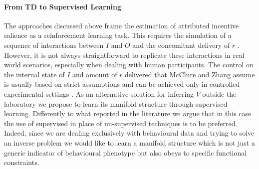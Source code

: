 \paragraph*{\textbf{From TD to Supervised Learning}}
\label{td_to_supervised}The approaches discussed above frame the estimation of attributed incentive salience as a reinforcement learning task. This requires the simulation of a sequence of interactions between $I$ and $O$ and the concomitant delivery of $r$  \cite{schultz1997neural,mcclure2003computational,zhang2009neural}. However, it is not always straightforward to replicate these interactions in real world scenarios, especially when dealing with human participants. The control on the internal state of $I$ and amount of $r$ delivered that McClure and Zhang assume is usually based on strict assumptions and can be achieved only in controlled experimental settings \cite{mcclure2003computational,zhang2009neural}. As an alternative solution for inferring $V$ outside the laboratory we propose to learn its manifold structure through supervised learning. Differently to what reported in the literature \cite{calhoun2019unsupervised, mccullough2021unsupervised, luxem2020identifying, pereira2020quantifying, shi2021learning} we argue that in this case the use of supervised in place of un-supervised techniques is to be preferred. Indeed, since we are dealing exclusively with behavioural data and trying to solve an inverse problem  we would like to learn a manifold structure which is not just a generic indicator of behavioural phenotype \cite{luxem2020identifying} but also obeys to specific functional constraints.

